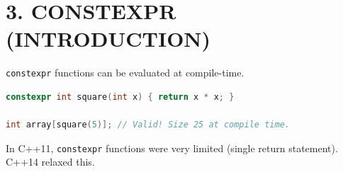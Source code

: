 \hypertarget{constexpr-introduction}{%
\section{3. CONSTEXPR (INTRODUCTION)}\label{constexpr-introduction}}

\passthrough{\lstinline!constexpr!} functions can be evaluated at
compile-time.

\begin{lstlisting}[language={C++}]
constexpr int square(int x) { return x * x; }

int array[square(5)]; // Valid! Size 25 at compile time.
\end{lstlisting}

In C++11, \passthrough{\lstinline!constexpr!} functions were very
limited (single return statement). C++14 relaxed this.
